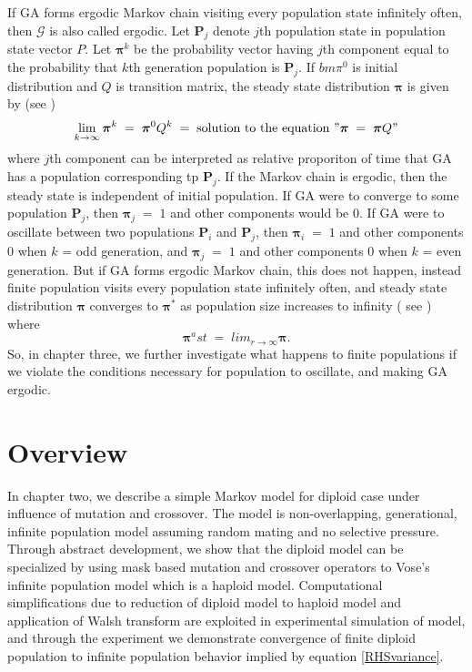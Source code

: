 If GA forms ergodic Markov chain visiting every population state infinitely often, then $\mathcal{G}$ is also called ergodic. 
Let $\bm{P}_j$ denote $j$th population state in population state vector $P$. Let $\bm{\pi}^k$ be the probability vector having $j$th component 
equal to the probability that $k$th generation population is $\bm{P}_j$. If $bm{\pi}^0$ is initial distribution and $Q$ is transition matrix, the steady state distribution $\bm{\pi}$ is given by (see \cite{Nix1992})
\[
\lim_{k \to \infty} \bm{\pi}^k \;=\; \bm{\pi}^0 Q^k \;=\; \text{solution to the equation } "\bm{\pi} \; = \; \bm{\pi} Q" 
\]
where $j$th component can be interpreted as relative proporiton of time that GA has a population corresponding tp $\bm{P}_j$. 
If the Markov chain is ergodic, then the steady state is independent of initial population. If GA were to converge to some population $\bm{P}_j$, 
then $\bm{\pi}_j \;=\; 1$ and other components would be $0$. If GA were to oscillate between two populations $\bm{P}_i$ and $\bm{P}_j$, then 
$\bm{\pi}_i \;=\; 1$ and other components $0$ when $k$ = odd generation, and $\bm{\pi}_j \;=\; 1$ and other components $0$ when $k$ = even generation. 
But if GA forms ergodic Markov chain, this does not happen, instead finite population visits every population state infinitely often, and steady state 
distribution $\bm{\pi}$ converges to $\bm{\pi}^\ast$ as population size increases to infinity ( see \cite{Nix1992}) where 
\[
\bm{\pi}^ast \;=\; lim_{r \to \infty} \bm{\pi}.
\]
So, in chapter three, we further investigate what happens to finite populations 
if we violate the conditions necessary for population to oscillate, and making GA ergodic.


\section{Overview}
In chapter two, we describe a simple Markov model for diploid case under influence of mutation and crossover. 
The model is non-overlapping, generational, infinite population model assuming random mating and no selective pressure. 
Through abstract development, we show that the diploid model can be specialized by using mask based 
mutation and crossover operators to Vose's infinite population model which is a haploid model. Computational 
simplifications due to reduction of diploid model to haploid model and application of Walsh transform 
are exploited in experimental simulation of model, and through the experiment we demonstrate convergence 
of finite diploid population to infinite population behavior implied by equation \ref{RHSvariance}.

